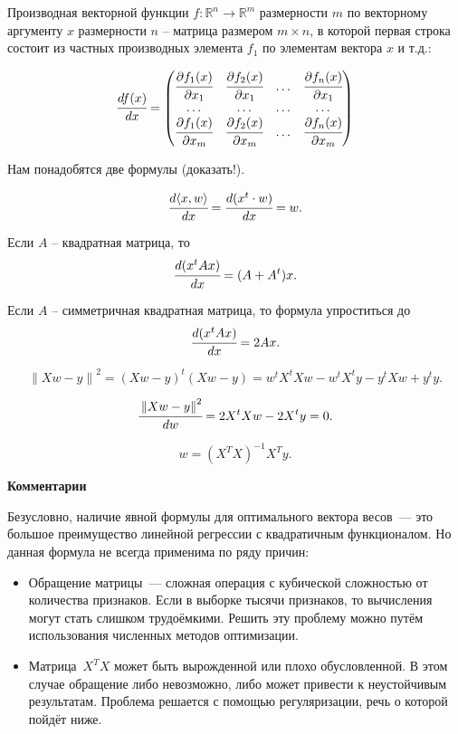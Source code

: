 \documentclass[12pt,fleqn]{article}
\begin{document}
Производная векторной функции $f: \mathbb{R}^n \to \mathbb{R}^m$ размерности $m$ по векторному аргументу $x$ размерности $n$ – матрица размером $m \times n$, в которой первая строка состоит из частных производных элемента $f_1$ по элементам вектора $x$ и т.д.: 

$$
\cfrac{df(x)}{dx}=\left(
\begin{matrix}
	\cfrac{\partial  f_1(x)}{\partial  x_1} & 
	\cfrac{\partial  f_2(x)}{\partial  x_1} & 
	\ldots & 
	\cfrac{\partial  f_n(x)}{\partial  x_1} \\
	\ldots & \ldots & \ldots & \ldots 	\\
	\cfrac{\partial  f_1(x)}{\partial  x_m} & 
	\cfrac{\partial  f_2(x)}{\partial  x_m} & 
	\ldots & 
	\cfrac{\partial  f_n(x)}{\partial  x_m} \\
\end{matrix}
\right)
$$


Нам понадобятся две формулы (доказать!). 

$$\cfrac{d \langle x, w \rangle }{dx} =\cfrac{d (x^t \cdot w) }{dx} = w.$$

Если $A$ -- квадратная матрица, то  
$$\cfrac{d (x^t A  x) }{dx} = (A+A^t) x.$$


Если $A$ -- симметричная квадратная матрица, то  формула упроститься до
$$\cfrac{d (x^t A  x) }{dx} =2 A x.$$


$$
\left\|
Xw - y
\right\|^2
= (Xw-y)^t (Xw-y) = w^t X^t X w -  w^t X^t  y - y^t Xw + y^t y.
$$

$$
\cfrac {\left\|
Xw - y
\right\|^2} {dw}
= 2 X^t X w - 2 X^t y = 0.
$$

$$
w
=
(X^T X)^{-1} X^T y.
$$

\textbf{Комментарии}

Безусловно, наличие явной формулы для оптимального вектора весов~--- это большое
преимущество линейной регрессии с квадратичным функционалом.
Но данная формула не всегда применима по ряду причин:
\begin{itemize}
    \item Обращение матрицы~--- сложная операция с кубической сложностью от количества признаков.
        Если в выборке тысячи признаков, то вычисления могут стать слишком трудоёмкими.
        Решить эту проблему можно путём использования численных методов оптимизации.
    \item Матрица~$X^T X$ может быть вырожденной или плохо обусловленной.
        В этом случае обращение либо невозможно, либо может привести к неустойчивым результатам.
        Проблема решается с помощью регуляризации, речь о которой пойдёт ниже.
\end{itemize}
\end{document}
